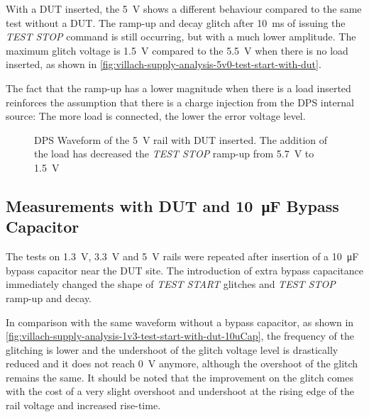 With a \ac{DUT} inserted, the \SI{5}{\volt} shows a different behaviour compared
to the same test without a \acs{DUT}.
The ramp-up and decay glitch after \SI{10}{\milli\second} of issuing the
\emph{TEST STOP} command is still occurring, but with a much lower amplitude.
The maximum glitch voltage is \SI{1.5}{\volt} compared to the \SI{5.5}{\volt}
when there is no load inserted, as shown in
\autoref{fig:villach-supply-analysis-5v0-test-start-with-dut}.

The fact that the ramp-up has a lower magnitude when there is a load inserted
reinforces the assumption that there is a charge injection from the \ac{DPS}
internal source: The more load is connected, the lower the error voltage level.

\begin{figure}[h!]
    \centering
    \caption[\SI{5}{\volt} Rail at \emph{TEST STOP} with \acs{DUT}]{
        \ac{DPS} Waveform of the \SI{5}{\volt} rail with \ac{DUT} inserted.
        The addition of the load has decreased the \emph{TEST STOP} ramp-up from
        \SI{5.7}{\volt} to \SI{1.5}{\volt}
    }
    \label{fig:villach-supply-analysis-5v0-test-start-with-dut}
\end{figure}

\subsection{Measurements with \acs{DUT} and \SI{10}{\micro\farad}
Bypass Capacitor}
\label{subsec:onsite-measurements-added-10uc-capacitance}

The tests on \SI{1.3}{\volt}, \SI{3.3}{\volt} and \SI{5}{\volt} rails were
repeated after insertion of a \SI{10}{\micro\farad} bypass capacitor near
the \ac{DUT} site.
The introduction of extra bypass capacitance immediately changed the shape of
\emph{TEST START} glitches and \emph{TEST STOP} ramp-up and decay.

In comparison with the same waveform without a bypass capacitor,
as shown
in \autoref{fig:villach-supply-analysis-1v3-test-start-with-dut-10uCap}, the
frequency of the glitching is lower and the undershoot of the glitch
voltage level is drastically reduced and it does not reach \SI{0}{\volt}
anymore, although the overshoot of the glitch remains the same.
It should be noted that the improvement on the glitch comes with the cost of
a very slight overshoot and undershoot at the rising edge of the rail voltage
and increased rise-time.

